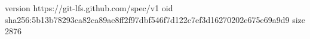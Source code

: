version https://git-lfs.github.com/spec/v1
oid sha256:5b13b78293ca82ca89ae8ff2f97dbf546f7d122c7ef3d16270202e675e69a9d9
size 2876
